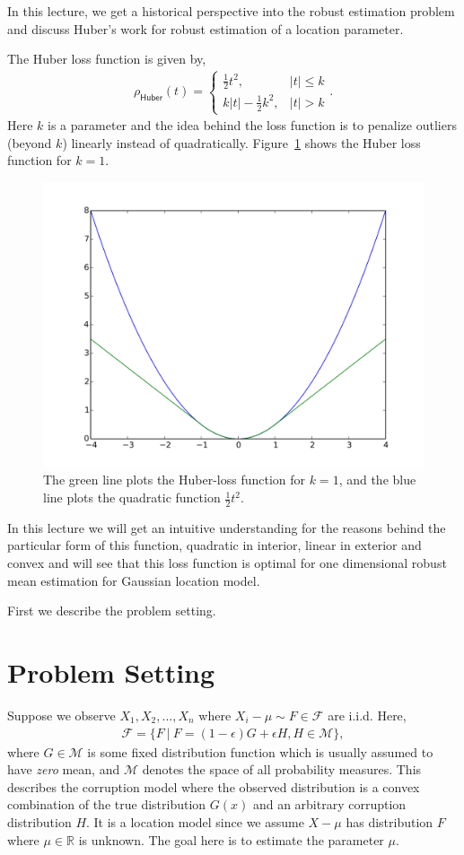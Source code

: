 \documentclass{article}
\newcommand{\abs}[1]{\ensuremath{\left|#1\right|}}
\begin{document}
In this lecture, we get a historical perspective into the robust estimation problem and discuss Huber's work \cite{huber} for robust estimation of a location parameter.

The Huber loss function is given by,
\begin{align}
     \rho_{\mathsf{Huber}}(t) = \begin{cases} \frac{1}{2} t^2, & \abs{t} \leq k \\ k \abs{t} - \frac{1}{2}k^2, & \abs{t} > k \end{cases}. \label{eq:huber}
\end{align}
Here $k$ is a parameter and the idea behind the loss function is to penalize outliers (beyond $k$) linearly instead of quadratically. Figure~\ref{fig:huber} shows the Huber loss function for $k = 1$.
\begin{figure}[h]
    \centering
    \includegraphics[width = 0.4 \textwidth ]{huber_loss.png}
    \caption{The green line plots the Huber-loss function for $k =1$, and the blue line plots the quadratic function $\frac{1}{2}t^2$.}
    \label{fig:huber}
\end{figure}
In this lecture we will get an intuitive understanding for the reasons behind the particular form of this function, quadratic in interior, linear in exterior and convex and will see that this loss function is optimal for one dimensional robust mean estimation for Gaussian location model. 

First we describe the problem setting.
\section{Problem Setting}

Suppose we observe $X_1, X_2, \dots, X_n$ where $X_i-\mu \sim F \in \mathcal{F}$ are i.i.d. 
Here,
\begin{align}
    \mathcal{F} = \{F \ | \ F= (1-\epsilon) G + \epsilon H, H \in \mathcal{M} \}, \label{eq:p}
\end{align}
where $G \in \mathcal{M}$ is some fixed distribution function which is usually assumed to have \emph{zero} mean, and $\mathcal{M}$ denotes the space of all probability measures. This describes the corruption model where the observed distribution is a convex combination of the true distribution $G(x)$ and an arbitrary corruption distribution $H$. It is a location model since we assume $X - \mu$ has distribution $F$ where $\mu \in \mathbb{R}$ is unknown. The goal here is to estimate the parameter $\mu$.\\
\end{document}
